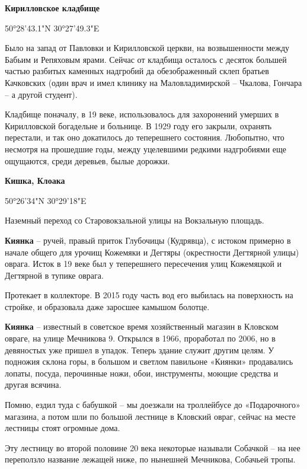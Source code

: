 \medskip

\textbf{Кирилловское кладбище} 

50°28'43.1"N 30°27'49.3"E

Было на запад от Павловки и Кирилловской церкви, на возвышенности между Бабьим и Репяховым ярами. Сейчас от кладбища осталось с десяток большей частью разбитых каменных надгробий да обезображенный склеп братьев Качковских (один врач и имел клинику на Маловладимирской – Чкалова, Гончара – а другой студент).

Кладбище поначалу, в 19 веке, использовалось для захоронений умерших в Кирилловской богадельне и больнице. В 1929 году его закрыли, охранять перестали, и так оно докатилось до теперешнего состояния. Любопытно, что несмотря на прошедшие годы, между уцелевшими редкими надгробиями еще ощущаются, среди деревьев, былые дорожки.\\

\medskip

\textbf{Кишка, Клоака} 

50°26'34"N 30°29'18"E

Наземный переход со Старовокзальной улицы на Вокзальную площадь.\\

\medskip

\textbf{Киянка} – ручей, правый приток Глубочицы (Кудрявца), с истоком примерно в начале общего для урочищ Кожемяки и Дегтяры (окрестности Дегтярной улицы) оврага. Исток в 19 веке был у теперешнего пересечения улиц Кожемяцкой и Дегтярной в тупике оврага.

Протекает в коллекторе. В 2015 году часть вод его выбилась на поверхность на стройке, и образовала даже заросшее камышом болотце.\\

\medskip

\textbf{Киянка} – известный в советское время хозяйственный магазин в Кловском овраге, на улице Мечникова 9. Открылся в 1966, проработал по 2006, но в девяностых уже пришел в упадок. Теперь здание служит другим целям. У подножия склона горы, в большом и светлом павильоне «Киянки» продавались лопаты, посуда, перочинные ножи, обои, инструменты, моющие средства и другая всячина.

Помню, ездил туда с бабушкой – мы доезжали на троллейбусе до «Подарочного» магазина, а потом шли по большой лестнице в Кловский овраг, сейчас на месте лестницы стоят огромные дома.

Эту лестницу во второй половине 20 века некоторые называли Собачкой – на нее переползло название лежащей ниже, по нынешней Мечникова, Собачьей тропы.\\

